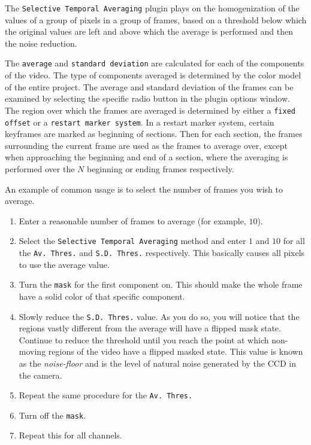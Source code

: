 The \texttt{Selective Temporal Averaging} plugin plays on the homogenization of the values of a group of pixels in a group of frames, based on a threshold below which the original values are left and above which the average is performed and then the noise reduction.

The \texttt{average} and \texttt{standard deviation} are calculated for each of the components of the video. The type of components averaged is determined by the color model of the entire project. The average and standard deviation of the frames can be examined by selecting the specific radio button in the plugin options window.
The region over which the frames are averaged is determined by either a \texttt{fixed offset} or a \texttt{restart marker system}. In a restart marker system, certain keyframes are marked as beginning of sections. Then for each section, the frames surrounding the current frame are used as the frames to average over, except when approaching the beginning and end of a section, where the averaging is performed over the $N$ beginning or ending frames respectively.

An example of common usage is to select the number of frames you wish to average.

\begin{enumerate}
    \item Enter a reasonable number of frames to average (for example, $10$).
    \item Select the \texttt{Selective Temporal Averaging} method and enter $1$ and $10$ for all the \texttt{Av. Thres.} and \texttt{S.D. Thres.} respectively. This basically causes all pixels to use the average value.
    \item Turn the \texttt{mask} for the first component on. This should make the whole frame have a solid color of that specific component.
    \item Slowly reduce the \texttt{S.D. Thres.} value. As you do so, you will notice that the regions vastly different from the average will have a flipped mask state. Continue to reduce the threshold until you reach the point at which non-moving regions of the video have a flipped masked state. This value is known as the \textit{noise-floor} and is the level of natural noise generated by the CCD in the camera.
    \item Repeat the same procedure for the \texttt{Av. Thres.}
    \item Turn off the \texttt{mask}.
    \item Repeat this for all channels.
\end{enumerate}

